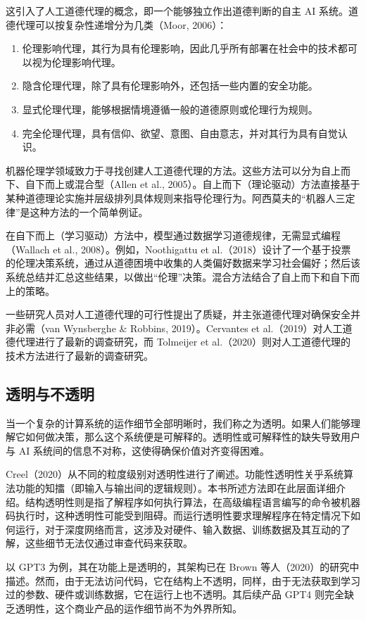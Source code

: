 \documentclass[lang=cn,newtx,10pt,scheme=chinese]{elegantbook}
\begin{document}
这引入了人工道德代理的概念，即一个能够独立作出道德判断的自主 AI 系统。道德代理可以按复杂性递增分为几类（Moor, 2006）：

\begin{enumerate}
\item 伦理影响代理，其行为具有伦理影响，因此几乎所有部署在社会中的技术都可以视为伦理影响代理。
\item 隐含伦理代理，除了具有伦理影响外，还包括一些内置的安全功能。
\item 显式伦理代理，能够根据情境遵循一般的道德原则或伦理行为规则。
\item 完全伦理代理，具有信仰、欲望、意图、自由意志，并对其行为具有自觉认识。
\end{enumerate}

机器伦理学领域致力于寻找创建人工道德代理的方法。这些方法可以分为自上而下、自下而上或混合型（Allen et al., 2005）。自上而下（理论驱动）方法直接基于某种道德理论实施并层级排列具体规则来指导伦理行为。阿西莫夫的“机器人三定律”是这种方法的一个简单例证。

在自下而上（学习驱动）方法中，模型通过数据学习道德规律，无需显式编程（Wallach et al., 2008）。例如，Noothigattu et al.（2018）设计了一个基于投票的伦理决策系统，通过从道德困境中收集的人类偏好数据来学习社会偏好；然后该系统总结并汇总这些结果，以做出“伦理”决策。混合方法结合了自上而下和自下而上的策略。

一些研究人员对人工道德代理的可行性提出了质疑，并主张道德代理对确保安全并非必需（van Wynsberghe \& Robbins, 2019）。Cervantes et al.（2019）对人工道德代理进行了最新的调查研究，而 Tolmeijer et al.（2020）则对人工道德代理的技术方法进行了最新的调查研究。

\subsection{透明与不透明}
当一个复杂的计算系统的运作细节全部明晰时，我们称之为透明。如果人们能够理解它如何做决策，那么这个系统便是可解释的。透明性或可解释性的缺失导致用户与 AI 系统间的信息不对称，这使得确保价值对齐变得困难。

Creel（2020）从不同的粒度级别对透明性进行了阐述。功能性透明性关乎系统算法功能的知擂（即输入与输出间的逻辑规则）。本书所述方法即在此层面详细介绍。结构透明性则是指了解程序如何执行算法，在高级编程语言编写的命令被机器码执行时，这种透明性可能受到阻碍。而运行透明性要求理解程序在特定情况下如何运行，对于深度网络而言，这涉及对硬件、输入数据、训练数据及其互动的了解，这些细节无法仅通过审查代码来获取。

以 GPT3 为例，其在功能上是透明的，其架构已在 Brown 等人（2020）的研究中描述。然而，由于无法访问代码，它在结构上不透明，同样，由于无法获取到学习过的参数、硬件或训练数据，它在运行上也不透明。其后续产品 GPT4 则完全缺乏透明性，这个商业产品的运作细节尚不为外界所知。
\end{document}
